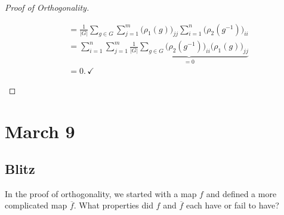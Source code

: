 \documentclass[12pt]{article}
\newcommand\inv[1]{#1^{-1}}
\theoremstyle{definition}
\begin{document}
\begin{proof}[Proof of Orthogonality]
\begin{enumerate}
\begin{equation}
\begin{split}
                & = \frac{1}{|G|} \sum\limits_{g \in G} \sum\limits_{j = 1}^m \big( \rho_1(g) \big)_{j j} \sum\limits_{i = 1}^n \big( \rho_2 \left( \inv{g} \right) \big)_{i i} \\
                & = \sum\limits_{i = 1}^n \sum\limits_{j = 1}^m \underbrace{ \frac{1}{|G|} \sum\limits_{g \in G} \big( \rho_2 \left( \inv{g} \right) \big)_{i i} \big( \rho_1(g) \big)_{j j} }_{= 0} \\
                & = \boxed{0.} \, \checkmark
            \end{split}
        \end{equation}
    \end{enumerate}
\end{proof}
\section{March 9}
\subsection{Blitz}
In the proof of orthogonality, we started with a map $f$ and defined a more complicated map $\overline{f}$. What properties did $f$ and $\overline{f}$ each have or fail to have?
\end{document}
